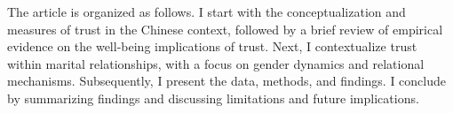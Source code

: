 The article is organized as follows. I start with the conceptualization and measures of trust in the Chinese context, followed by a brief review of empirical evidence on the well-being implications of trust. Next, I contextualize trust within marital relationships, with a focus on gender dynamics and relational mechanisms. Subsequently, I present the data, methods, and findings. I conclude by summarizing findings and discussing limitations and future implications.
